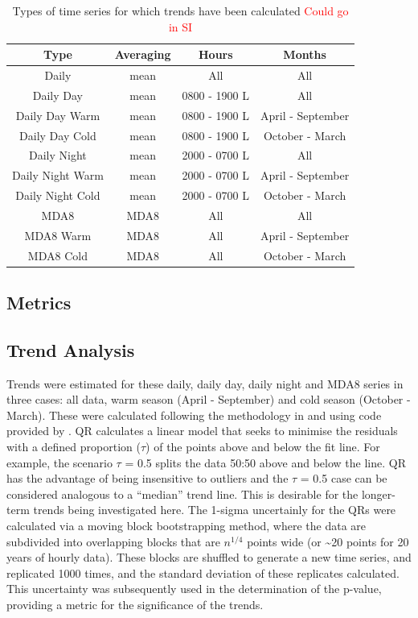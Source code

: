 \documentclass[journal abbreviation, manuscript]{copernicus}
\begin{document}
\begin{table}[h]
\caption{Types of time series for which trends have been calculated \textcolor{red}{Could go in SI}}
\begin{tabular}{c|c c c}
Type              & Averaging & Hours         & Months            \\ \hline
Daily             & mean      & All           & All               \\
Daily Day         & mean      & 0800 - 1900 L & All               \\
Daily Day Warm    & mean      & 0800 - 1900 L & April - September \\
Daily Day Cold    & mean      & 0800 - 1900 L & October - March   \\
Daily Night       & mean      & 2000 - 0700 L & All               \\
Daily Night Warm  & mean      & 2000 - 0700 L & April - September \\
Daily Night Cold  & mean      & 2000 - 0700 L & October - March   \\
MDA8              & MDA8      & All           & All               \\
MDA8 Warm         & MDA8      & All           & April - September \\
MDA8 Cold         & MDA8      & All           & October - March   \\
\end{tabular}
\label{tab:ts_types}
\end{table}

\subsection{Metrics}

\subsection{Trend Analysis}
Trends were estimated for these daily, daily day, daily night and MDA8 series in three cases: all data, warm season (April - September) and cold season (October - March). These were calculated following the methodology in and using code provided by  \cite{chang2023guidancenotebeststatistical}. QR calculates a linear model that seeks to minimise the residuals with a defined proportion ($\tau$) of the points above and below the fit line. For example, the scenario $\tau$ = 0.5 splits the data 50:50 above and below the line. QR has the advantage of being insensitive to outliers and the $\tau$ = 0.5 case can be considered analogous to a “median” trend line. This is desirable for the longer-term trends being investigated here. The 1-sigma uncertainly for the QRs were calculated via a moving block bootstrapping method, where the data are subdivided into overlapping blocks that are $n^{1/4}$ points wide (or \textasciitilde{20} points for 20 years of hourly data). These blocks are shuffled to generate a new time series, and replicated 1000 times, and the standard deviation of these replicates calculated. This uncertainty was subsequently used in the determination of the p-value, providing a metric for the significance of the trends. 
\end{document}
